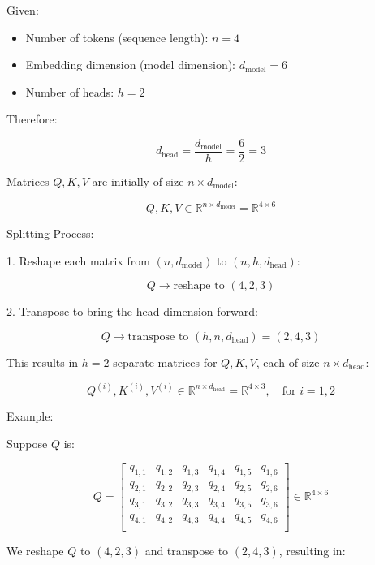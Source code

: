 \documentclass{article}
\begin{document}
Given:

\begin{itemize}
    \item Number of tokens (sequence length): \( n = 4 \)
    \item Embedding dimension (model dimension): \( d_{\text{model}} = 6 \)
    \item Number of heads: \( h = 2 \)
\end{itemize}

Therefore:

\[
    d_{\text{head}} = \frac{d_{\text{model}}}{h} = \frac{6}{2} = 3
\]

Matrices \( Q, K, V \) are initially of size \( n \times d_{\text{model}} \):

\[
    Q, K, V \in \mathbb{R}^{n \times d_{\text{model}}} = \mathbb{R}^{4 \times 6}
\]

Splitting Process:

1. Reshape each matrix from \( (n, d_{\text{model}}) \) to \( (n, h, d_{\text{head}}) \):

   \[
   Q \rightarrow \text{reshape to } (4, 2, 3)
   \]

2. Transpose to bring the head dimension forward:

   \[
   Q \rightarrow \text{transpose to } (h, n, d_{\text{head}}) = (2, 4, 3)
   \]

This results in \( h = 2 \) separate matrices for \( Q, K, V \), each of size \( n \times d_{\text{head}} \):

\[
    Q^{(i)}, K^{(i)}, V^{(i)} \in \mathbb{R}^{n \times d_{\text{head}}} = \mathbb{R}^{4 \times 3}, \quad \text{for } i = 1, 2
\]

Example:

Suppose \( Q \) is:

\[
    Q = \begin{bmatrix}
        q_{1,1} & q_{1,2} & q_{1,3} & q_{1,4} & q_{1,5} & q_{1,6} \\
        q_{2,1} & q_{2,2} & q_{2,3} & q_{2,4} & q_{2,5} & q_{2,6} \\
        q_{3,1} & q_{3,2} & q_{3,3} & q_{3,4} & q_{3,5} & q_{3,6} \\
        q_{4,1} & q_{4,2} & q_{4,3} & q_{4,4} & q_{4,5} & q_{4,6} \\
    \end{bmatrix}
    \in \mathbb{R}^{4 \times 6}
\]

We reshape \( Q \) to \( (4, 2, 3) \) and transpose to \( (2, 4, 3) \), resulting in:
\end{document}
